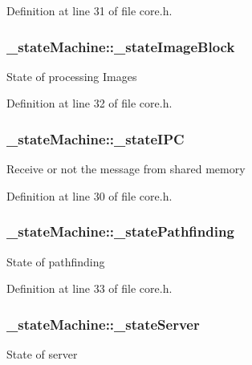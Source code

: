 Definition at line 31 of file core.\-h.

\hypertarget{struct__state_machine_adbc0e51d4bed9b6da5c44e921e37dc32}{
\subsubsection[{\-\_\-state\-Image\-Block}]{ \-\_\-state\-Machine\-::\-\_\-state\-Image\-Block}}\label{struct__state_machine_adbc0e51d4bed9b6da5c44e921e37dc32}
State of processing Images 

Definition at line 32 of file core.\-h.

\hypertarget{struct__state_machine_aa6cc70d0567b403fb9e993a681f48b85}{
\subsubsection[{\-\_\-state\-I\-P\-C}]{ \-\_\-state\-Machine\-::\-\_\-state\-I\-P\-C}}\label{struct__state_machine_aa6cc70d0567b403fb9e993a681f48b85}
Receive or not the message from shared memory 

Definition at line 30 of file core.\-h.

\hypertarget{struct__state_machine_a79ce614ae01c3759d155c03026384ca7}{
\subsubsection[{\-\_\-state\-Pathfinding}]{ \-\_\-state\-Machine\-::\-\_\-state\-Pathfinding}}\label{struct__state_machine_a79ce614ae01c3759d155c03026384ca7}
State of pathfinding 

Definition at line 33 of file core.\-h.

\hypertarget{struct__state_machine_aaee24e4ab99a6f1243a46645188de8d0}{
\subsubsection[{\-\_\-state\-Server}]{ \-\_\-state\-Machine\-::\-\_\-state\-Server}}\label{struct__state_machine_aaee24e4ab99a6f1243a46645188de8d0}
State of server 

